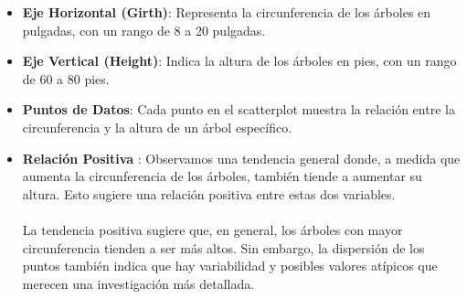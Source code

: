 \documentclass{article}
\begin{document}
\begin{itemize}
    \item \textbf{Eje Horizontal (Girth)}: Representa la circunferencia de los árboles en pulgadas, con un rango de 8 a 20 pulgadas.
    \item \textbf{Eje Vertical (Height)}: Indica la altura de los árboles en pies, con un rango de 60 a 80 pies.
    \item \textbf{Puntos de Datos}: Cada punto en el scatterplot muestra la relación entre la circunferencia y la altura de un árbol específico.
    \item \textbf{Relación Positiva }: Observamos una tendencia general donde, a medida que aumenta la circunferencia de los árboles, también tiende a aumentar su altura. Esto sugiere una relación positiva entre estas dos variables. \\ \\La tendencia positiva sugiere que, en general, los árboles con mayor circunferencia tienden a ser más altos. Sin embargo, la dispersión de los puntos también indica que hay variabilidad y posibles valores atípicos que merecen una investigación más detallada.
\end{itemize}
\newpage
\end{document}
